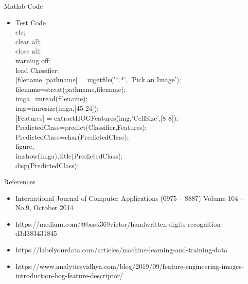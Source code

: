 \documentclass[8pt,final,hyperref={pdfpagelabels=false}]{beamer}
\theoremstyle{plain}
\begin{document}
\begin{frame}
\begin{columns}[t]
\begin{column}{.23\textwidth}
\begin{block}{Matlab Code}
\begin{itemize}
            
        \end{itemize}
       
       \begin{itemize}
            \item Test Code\\
            \vspace{\baselineskip}
            clc;\\
    clear all;\\
    close all;\\
    warning off;\\
    load Classifier;\\
   {[filename, pathname]} = uigetfile('*.*', 'Pick an Image');\\
    filename=strcat(pathname,filename);\\
    imga=imread(filename);\\
    img=imresize(imga,[45 24]);\\
    {[Features]} = extractHOGFeatures(img,'CellSize',[8 8]);\\
    PredictedClass=predict(Classifier,Features);\\
    PredictedClass=char(PredictedClass);\\
    figure,\\imshow(imga),title(PredictedClass);\\
    disp(PredictedClass);\\

            
        \end{itemize}

       
    \end{block}
    \begin{block}{References}
        
        \begin{itemize}
            \item International Journal of Computer Applications (0975 – 8887) Volume 104 – No.9, October 2014 
            
            \item 	https://medium.com/@basu369victor/handwritten-digits-recognition-d3d383431845
            
            \item 	https://labelyourdata.com/articles/machine-learning-and-training-data
            
             \item https://www.analyticsvidhya.com/blog/2019/09/feature-engineering-images-introduction-hog-feature-descriptor/
        \end{itemize}
    \end{block}

\end{column} %
\end{columns} %
\end{frame} %
\end{document}
